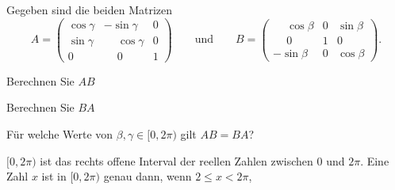 Gegeben sind die beiden Matrizen
\[
A
=
\begin{pmatrix}
\cos\gamma&         - \sin\gamma&0\\
\sin\gamma&\phantom{-}\cos\gamma&0\\
    0     &\phantom{-}    0     &1
\end{pmatrix}
\qquad\text{und}\qquad
B
=
\begin{pmatrix}
\phantom{-}\cos\beta&0&\sin\beta\\
\phantom{-}    0    &1&    0    \\
         - \sin\beta&0&\cos\beta
\end{pmatrix}.
\]
\begin{teilaufgaben}
\item Berechnen Sie $AB$
\item Berechnen Sie $BA$
\item Für welche Werte von $\beta,\gamma\in[0,2\pi)$ gilt
$AB=BA$?
\end{teilaufgaben}

\begin{hinweis}
$[0,2\pi)$ ist das rechts offene Interval der reellen Zahlen zwischen 
$0$ und $2\pi$.
Eine Zahl $x$ ist in $[0,2\pi)$ genau dann,
wenn $2\le x<2\pi$,
\end{hinweis}

